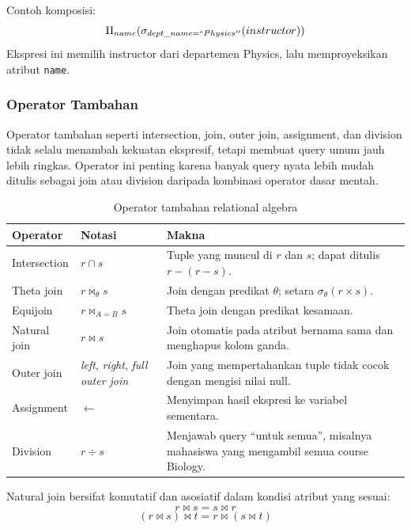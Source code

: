 Contoh komposisi:
\[
    \Pi_{name}(\sigma_{dept\_name = ``Physics''}(instructor))
\]
Ekspresi ini memilih instructor dari departemen Physics, lalu memproyeksikan atribut \texttt{name}.

\subsubsection{Operator Tambahan}

\begin{jawab}
Operator tambahan seperti intersection, join, outer join, assignment, dan division tidak selalu menambah kekuatan ekspresif, tetapi membuat query umum jauh lebih ringkas. Operator ini penting karena banyak query nyata lebih mudah ditulis sebagai join atau division daripada kombinasi operator dasar mentah.
\end{jawab}

\begin{table}[H]
\centering
\small
\begin{tabularx}{\textwidth}{|L{0.18\textwidth}|L{0.18\textwidth}|X|}
\hline
\textbf{Operator} & \textbf{Notasi} & \textbf{Makna} \\
\hline
Intersection & \(r \cap s\) & Tuple yang muncul di \(r\) dan \(s\); dapat ditulis \(r-(r-s)\). \\
\hline
Theta join & \(r \bowtie_{\theta} s\) & Join dengan predikat \(\theta\); setara \(\sigma_{\theta}(r \times s)\). \\
\hline
Equijoin & \(r \bowtie_{A=B} s\) & Theta join dengan predikat kesamaan. \\
\hline
Natural join & \(r \bowtie s\) & Join otomatis pada atribut bernama sama dan menghapus kolom ganda. \\
\hline
Outer join & \textit{left}, \textit{right}, \textit{full outer join} & Join yang mempertahankan tuple tidak cocok dengan mengisi nilai null. \\
\hline
Assignment & \(\leftarrow\) & Menyimpan hasil ekspresi ke variabel sementara. \\
\hline
Division & \(r \div s\) & Menjawab query ``untuk semua'', misalnya mahasiswa yang mengambil semua course Biology. \\
\hline
\end{tabularx}
\caption{Operator tambahan relational algebra}
\label{tab:additional-ra-operators}
\end{table}

Natural join bersifat komutatif dan asosiatif dalam kondisi atribut yang sesuai:
\[
    r \bowtie s = s \bowtie r
\]
\[
    (r \bowtie s) \bowtie t = r \bowtie (s \bowtie t)
\]

